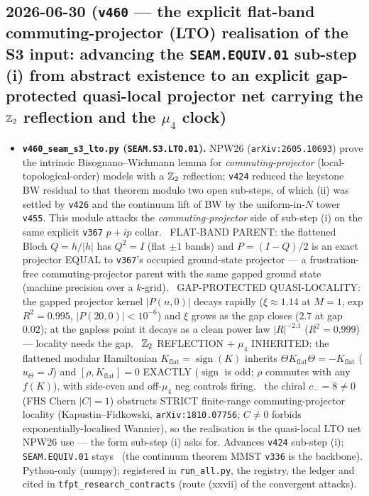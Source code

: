 \subsection*{2026-06-30 (\texttt{v460} --- the explicit flat-band commuting-projector (LTO) realisation of the S3 input: advancing the \texttt{SEAM.EQUIV.01} sub-step (i) from abstract existence to an explicit gap-protected quasi-local projector net carrying the $\mathbb{Z}_2$ reflection and the $\mu_4$ clock)}
\begin{itemize}
\item \textbf{\texttt{v460\_seam\_s3\_lto.py} (\texttt{SEAM.S3.LTO.01}).} NPW26 (\texttt{arXiv:2605.10693}) prove the
intrinsic Bisognano--Wichmann lemma for \emph{commuting-projector} (local-topological-order) models with a $\mathbb{Z}_2$
reflection; \texttt{v424} reduced the keystone BW residual to that theorem modulo two open sub-steps, of which (ii)
was settled by \texttt{v426} and the continuum lift of BW by the uniform-in-$N$ tower \texttt{v455}. This module
attacks the \emph{commuting-projector} side of sub-step (i) on the same explicit \texttt{v367} $p{+}ip$ collar.
\mE\ FLAT-BAND PARENT: the flattened Bloch $Q{=}h/|h|$ has $Q^2{=}I$ (flat $\pm1$ bands) and $P{=}(I{-}Q)/2$ is an
exact projector EQUAL to \texttt{v367}'s occupied ground-state projector --- a frustration-free commuting-projector
parent with the same gapped ground state (machine precision over a $k$-grid). \mE\ GAP-PROTECTED QUASI-LOCALITY:
the gapped projector kernel $|P(n,0)|$ decays rapidly ($\xi{\approx}1.14$ at $M{=}1$, exp $R^2{=}0.995$,
$|P(20,0)|{<}10^{-6}$) and $\xi$ grows as the gap closes ($2.7$ at gap $0.02$); at the gapless point it decays as a
clean power law $|R|^{-2.1}$ ($R^2{=}0.999$) --- locality needs the gap. \mE\ $\mathbb{Z}_2$ REFLECTION $+$ $\mu_4$
INHERITED: the flattened modular Hamiltonian $K_{\mathrm{flat}}{=}\operatorname{sign}(K)$ inherits
$\Theta K_{\mathrm{flat}}\Theta{=}{-}K_{\mathrm{flat}}$ ($u_\Theta{=}J$) and $[\rho,K_{\mathrm{flat}}]{=}0$ EXACTLY
($\operatorname{sign}$ is odd; $\rho$ commutes with any $f(K)$), with side-even and off-$\mu_4$ neg controls firing.
\mC\mO\ the chiral $c_-{=}8{\neq}0$ (FHS Chern $|C|{=}1$) obstructs STRICT finite-range commuting-projector locality
(Kapustin--Fidkowski, \texttt{arXiv:1810.07756}; $C{\neq}0$ forbids exponentially-localised Wannier), so the
realisation is the quasi-local LTO net NPW26 use --- the form sub-step (i) asks for. Advances \texttt{v424} sub-step
(i); \texttt{SEAM.EQUIV.01} stays \mO\ (the continuum theorem MMST \texttt{v336} is the backbone). Python-only
(numpy); registered in \texttt{run\_all.py}, the registry, the ledger and cited in
\texttt{tfpt\_research\_contracts} (route (xxvii) of the convergent attacks).
\end{itemize}

